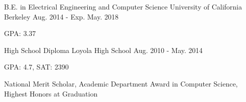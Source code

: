 \vspace{-6mm}
\vspace{-2mm}

\begin{cventries}

  \cventry
    {B.E. in Electrical Engineering and Computer Science} %
    {University of California Berkeley} %
    {Aug. 2014 - Exp. May. 2018} %
    {} %
    {
      \begin{cvitems} %
        \item GPA: 3.37
      \end{cvitems}
    }
      \cventry
    {High School Diploma} %
    {Loyola High School} %
    {Aug. 2010 -  May. 2014} %
    {} %
    {
      \begin{cvitems} %
        \item GPA: 4.7, SAT: 2390
        \item National Merit Scholar, Academic Department Award in Computer Science, Highest Honors at Graduation
      \end{cvitems}
    }

\end{cventries}
